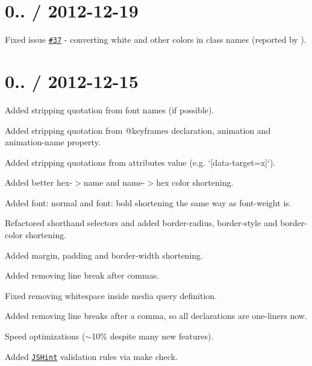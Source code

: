 \section*{0.. / 2012-\/12-\/19 }


\begin{DoxyItemize}
\item Fixed issue \href{https://github.com/jakubpawlowicz/clean-css/issues/37}{\tt \#37} -\/ converting {\ttfamily white} and other colors in class names (reported by \href{https://github.com/malgorithms}{\tt }).
\end{DoxyItemize}

\section*{0.. / 2012-\/12-\/15 }


\begin{DoxyItemize}
\item Added stripping quotation from font names (if possible).
\item Added stripping quotation from {\ttfamily @keyframes} declaration, {\ttfamily animation} and {\ttfamily animation-\/name} property.
\item Added stripping quotations from attributes\textquotesingle{} value (e.\+g. `\mbox{[}data-\/target=\textquotesingle{}x\textquotesingle{}\mbox{]}`).
\item Added better hex-\/$>$name and name-\/$>$hex color shortening.
\item Added {\ttfamily font\+: normal} and {\ttfamily font\+: bold} shortening the same way as {\ttfamily font-\/weight} is.
\item Refactored shorthand selectors and added {\ttfamily border-\/radius}, {\ttfamily border-\/style} and {\ttfamily border-\/color} shortening.
\item Added {\ttfamily margin}, {\ttfamily padding} and {\ttfamily border-\/width} shortening.
\item Added removing line break after commas.
\item Fixed removing whitespace inside media query definition.
\item Added removing line breaks after a comma, so all declarations are one-\/liners now.
\item Speed optimizations ($\sim$10\% despite many new features).
\item Added \href{https://github.com/jshint/jshint/}{\tt J\+S\+Hint} validation rules via {\ttfamily make check}.
\end{DoxyItemize}

